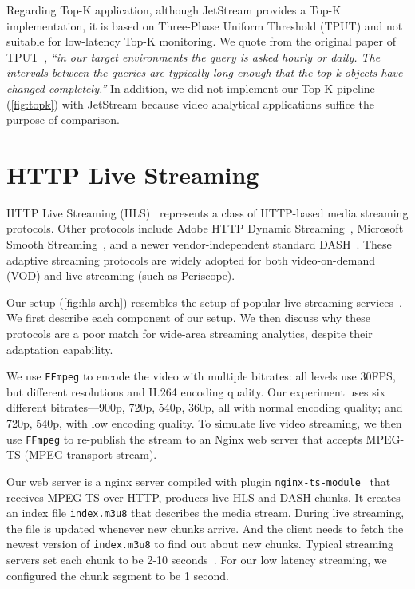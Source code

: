 \documentclass[twocolumn, 9pt]{article}
\begin{document}
Regarding Top-K application, although JetStream provides a Top-K implementation,
it is based on Three-Phase Uniform Threshold (TPUT) and not suitable for
low-latency Top-K monitoring. We quote from the original paper of
TPUT~\cite{cao2004efficient}, \textit{``in our target environments the query is
  asked hourly or daily. The intervals between the queries are typically long
  enough that the top-k objects have changed completely.''} In addition, we did
not implement our Top-K pipeline (\autoref{fig:topk}) with JetStream because
video analytical applications suffice the purpose of comparison.

\section{HTTP Live Streaming}
\label{appendix:hls}

HTTP Live Streaming (HLS)~\cite{pantos2016http} represents a class of HTTP-based
media streaming protocols. Other protocols include Adobe HTTP Dynamic
Streaming~\cite{adobestreaming}, Microsoft Smooth
Streaming~\cite{zambelli2009iis}, and a newer vendor-independent standard
DASH~\cite{michalos2012dynamic, sodagar2011mpeg}. These adaptive streaming
protocols are widely adopted for both video-on-demand (VOD) and live streaming
(such as Periscope).

Our setup (\autoref{fig:hls-arch}) resembles the setup of popular live streaming
services~\cite{wang2016anatomy}. We first describe each component of our
setup. We then discuss why these protocols are a poor match for wide-area
streaming analytics, despite their adaptation capability.

 We use \texttt{FFmpeg} to encode the video with multiple bitrates:
all levels use 30FPS, but different resolutions and H.264 encoding quality. Our
experiment uses six different bitrates---900p, 720p, 540p, 360p, all with normal
encoding quality; and 720p, 540p, with low encoding quality. To simulate live
video streaming, we then use \texttt{FFmpeg} to re-publish the stream to an
Nginx web server that accepts MPEG-TS (MPEG transport stream).

 Our web server is a nginx server compiled with plugin
\texttt{nginx-ts-module}~\cite{nginx-ts-module} that receives MPEG-TS over HTTP,
produces live HLS and DASH chunks. It creates an index file \texttt{index.m3u8}
that describes the media stream. During live streaming, the file is updated
whenever new chunks arrive. And the client needs to fetch the newest version of
\texttt{index.m3u8} to find out about new chunks. Typical streaming servers set
each chunk to be 2-10 seconds~\cite{mao2017neural, sun2016cs2p,
  wang2016anatomy}. For our low latency streaming, we configured the chunk
segment to be 1 second.
\end{document}
